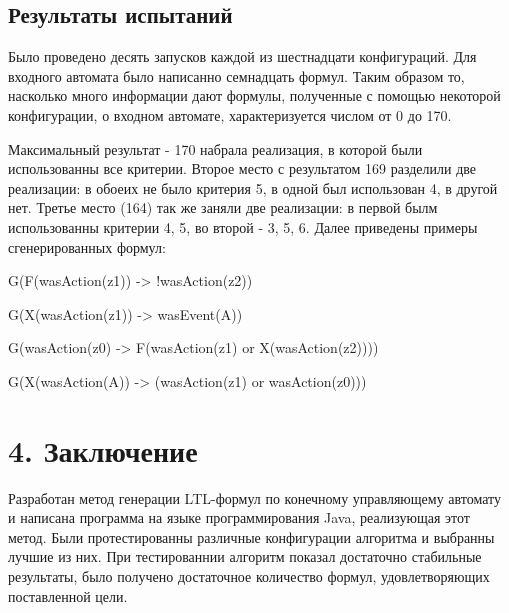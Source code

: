 \documentclass[12pt]{article}
\begin{document}
\subsection*{Результаты испытаний}

Было проведено десять запусков каждой из шестнадцати конфигураций. Для входного автомата было написанно семнадцать формул.
Таким образом то, насколько много информации дают формулы, полученные с помощью некоторой конфигурации, о входном автомате,
характеризуется числом от 0 до 170.

Максимальный результат - 170 набрала реализация, в которой были использованны все критерии. Второе место с результатом 169
разделили две реализации: в обоеих не было критерия 5, в одной был использован 4, в другой нет. Третье место (164) так же
заняли две реализации: в первой былм использованны критерии 4, 5, во второй - 3, 5, 6. Далее приведены примеры сгенерированных
формул: 

G(F(wasAction(z1)) -> !wasAction(z2))

G(X(wasAction(z1)) -> wasEvent(A))

G(wasAction(z0) -> F(wasAction(z1) or X(wasAction(z2))))

G(X(wasAction(A)) -> (wasAction(z1) or wasAction(z0)))

\section*{4. Заключение}

Разработан метод генерации LTL-формул по конечному управляющему автомату и написана программа на языке программирования Java,
реализующая этот метод. Были протестированны различные конфигурации алгоритма и выбранны лучшие из них. При тестированнии
алгоритм показал достаточно стабильные результаты, было получено достаточное количество формул, удовлетворяющих поставленной цели.
\end{document}
